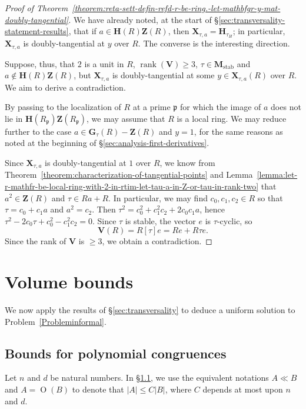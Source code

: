 \documentclass[reqno]{amsart}
\DeclareMathOperator{\stab}{stab}
\def\O{\operatorname{O}}
\DeclareMathOperator{\rank}{rank}
\theoremstyle{plain} \newtheorem{theorem} {Theorem} \newtheorem{conjecture} {Conjecture} \newtheorem{corollary} [theorem] {Corollary} \newtheorem{proposition} [theorem] {Proposition} \newtheorem{fact} [theorem] {Fact}
\theoremstyle{definition} \newtheorem{definition} [theorem] {Definition}
\theoremstyle{itplain} %
\begin{document}
\begin{proof}[Proof of Theorem~\ref{theorem:reta-sett-defin-refd-r-be-ring.-let-mathbfgr-y-mat-doubly-tangential}]
  We have already noted, at the start of \S\ref{sec:transversality-statement-results}, that if $a \in \mathbf{H}(R) \mathbf{Z}(R)$, then $\mathbf{X}_{\tau,a} = \mathbf{H}_{\tau_H}$; in particular, $\mathbf{X}_{\tau,a}$ is doubly-tangential at $y$ over $R$.  The converse is the interesting direction.

  Suppose, thus, that $2$ is a unit in $R$, $\rank(\mathbf{V}) \geq 3$, $\tau \in \mathbf{M}_{\stab}$ and $a \notin\mathbf{H}(R) \mathbf{Z}(R)$, but $\mathbf{X}_{\tau,a}$ is doubly-tangential at some $y \in \mathbf{X}_{\tau,a}(R)$ over $R$.  We aim to derive a contradiction.

  By passing to the localization of $R$ at a prime $\mathfrak{p}$ for which the image of $a$ does not lie in $\mathbf{H}(R_\mathfrak{p}) \mathbf{Z}(R_\mathfrak{p})$, we may assume that $R$ is a local ring.  We may reduce further to the case $a \in \mathbf{G}_\tau(R) - \mathbf{Z}(R)$ and $y=1$, for the same reasons as noted at the beginning of \S\ref{sec:analysis-first-derivatives}.

  Since $\mathbf{X}_{\tau,a}$ is doubly-tangential at $1$ over $R$, we know from Theorem~\ref{theorem:characterization-of-tangential-points} and Lemma~\ref{lemma:let-r-mathfr-be-local-ring-with-2-in-rtim-let-tau-a-in-Z-or-tau-in-rank-two} that $a^2 \in \mathbf{Z}(R)$ and $\tau \in R a + R$.  In particular, we may find $c_0,c_1,c_2 \in R$ so that $\tau = c_0 + c_1 a$ and $a^2 = c_2$.  Then $\tau ^2 = c _0 ^2 + c _1^2 c _2 + 2 c _0 c _1 a$, hence $\tau ^2 - 2 c _0 \tau + c _0 ^2 - c _1 ^2 c _2 =0$.  Since $\tau$ is stable, the vector $e$ is $\tau$-cyclic, so
  \begin{equation*}
    \mathbf{V}(R) = R [\tau] e = R e + R \tau e.
  \end{equation*}
  Since the rank of $\mathbf{V}$ is $\geq 3$, we obtain a contradiction.
\end{proof}
\section{Volume bounds}\label{sec:volumebound}
We now apply the results of \S\ref{sec:transversality} to deduce a uniform solution to Problem~\ref{Probleminformal}.

\subsection{Bounds for polynomial congruences}\label{sec:cj3v60uw7y}
Let $n$ and $d$ be natural numbers.  In \S\ref{sec:cj3v60uw7y},  we use the equivalent notations $A \ll B$ and $A = \O(B)$ to denote that $|A| \leq C |B|$, where $C$ depends at most upon $n$ and $d$.
\end{document}
